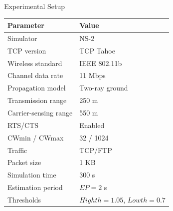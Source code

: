 \begin{frame}{Experimental Setup}

\begin{center}
\begin{tabular}{p{} p{}}
\toprule
\textbf{Parameter} & \textbf{Value} \\
\midrule
Simulator & NS-2 \\
TCP version & TCP Tahoe \\
Wireless standard & IEEE 802.11b \\
Channel data rate & 11 Mbps \\
Propagation model & Two-ray ground \\
Transmission range & 250 m \\
Carrier-sensing range & 550 m \\
RTS/CTS & Enabled \\
CWmin / CWmax & 32 / 1024 \\
Traffic & TCP/FTP \\
Packet size & 1 KB \\
Simulation time & 300 s \\
Estimation period & $EP=2$ s \\
Thresholds & $Highth=1.05$, $Lowth=0.7$ \\
\bottomrule
\end{tabular}
\end{center}
\end{frame}
